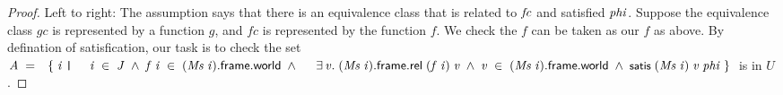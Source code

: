 \documentclass[letterpaper]{article}
\renewcommand{\HOLConst}[1]{{\textsf{\upshape\small #1}}}
\renewcommand{\HOLinline}[1]{\ensuremath{#1}}
\begin{document}
\begin{proof}
Left to right: The assumption says that there is an equivalence class that is related to \HOLinline{\HOLFreeVar{fc}} and satisfied \HOLinline{\HOLFreeVar{phi}}. Suppose the equivalence class $gc$ is represented by a function $g$, and $fc$ is represented by the function $f$. We check the $f$ can be taken as our $f$ as above. By defination of satisfication, our task is to check the set \HOLinline{\HOLFreeVar{A}\;\HOLSymConst{=}\\
\;\;\HOLTokenLeftbrace{}\HOLBoundVar{i}\;\HOLTokenBar{}\\
\;\;\;\;\;\HOLBoundVar{i}\;\HOLSymConst{\HOLTokenIn{}}\;\HOLFreeVar{J}\;\HOLSymConst{\HOLTokenConj{}}\;\HOLFreeVar{f}\;\HOLBoundVar{i}\;\HOLSymConst{\HOLTokenIn{}}\;(\HOLFreeVar{Ms}\;\HOLBoundVar{i}).\HOLFieldName{frame}.\HOLFieldName{world}\;\HOLSymConst{\HOLTokenConj{}}\\
\;\;\;\;\;\HOLSymConst{\HOLTokenExists{}}\HOLBoundVar{v}.\;(\HOLFreeVar{Ms}\;\HOLBoundVar{i}).\HOLFieldName{frame}.\HOLFieldName{rel}\;(\HOLFreeVar{f}\;\HOLBoundVar{i})\;\HOLBoundVar{v}\;\HOLSymConst{\HOLTokenConj{}}\;\HOLBoundVar{v}\;\HOLSymConst{\HOLTokenIn{}}\;(\HOLFreeVar{Ms}\;\HOLBoundVar{i}).\HOLFieldName{frame}.\HOLFieldName{world}\;\HOLSymConst{\HOLTokenConj{}}\;\HOLConst{satis}\;(\HOLFreeVar{Ms}\;\HOLBoundVar{i})\;\HOLBoundVar{v}\;\HOLFreeVar{phi}\HOLTokenRightbrace{}} is in $U$. 


\end{proof}
\end{document}
